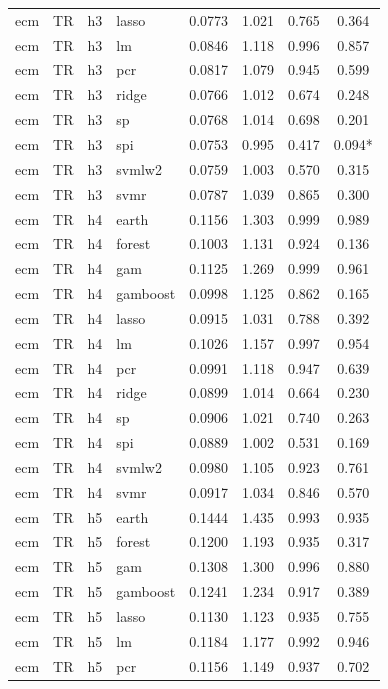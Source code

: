 \begin{ThreePartTable}
\begin{longtable}[t]{llclcccc}
ecm & TR & h3 & lasso & 0.0773 & 1.021 & 0.765 & 0.364\\
ecm & TR & h3 & lm & 0.0846 & 1.118 & 0.996 & 0.857\\
ecm & TR & h3 & pcr & 0.0817 & 1.079 & 0.945 & 0.599\\
ecm & TR & h3 & ridge & 0.0766 & 1.012 & 0.674 & 0.248\\
ecm & TR & h3 & sp & 0.0768 & 1.014 & 0.698 & 0.201\\
ecm & TR & h3 & spi & 0.0753 & 0.995 & 0.417 & 0.094*\\
ecm & TR & h3 & svmlw2 & 0.0759 & 1.003 & 0.570 & 0.315\\
ecm & TR & h3 & svmr & 0.0787 & 1.039 & 0.865 & 0.300\\
\addlinespace
ecm & TR & h4 & earth & 0.1156 & 1.303 & 0.999 & 0.989\\
ecm & TR & h4 & forest & 0.1003 & 1.131 & 0.924 & 0.136\\
ecm & TR & h4 & gam & 0.1125 & 1.269 & 0.999 & 0.961\\
ecm & TR & h4 & gamboost & 0.0998 & 1.125 & 0.862 & 0.165\\
ecm & TR & h4 & lasso & 0.0915 & 1.031 & 0.788 & 0.392\\
ecm & TR & h4 & lm & 0.1026 & 1.157 & 0.997 & 0.954\\
ecm & TR & h4 & pcr & 0.0991 & 1.118 & 0.947 & 0.639\\
ecm & TR & h4 & ridge & 0.0899 & 1.014 & 0.664 & 0.230\\
ecm & TR & h4 & sp & 0.0906 & 1.021 & 0.740 & 0.263\\
ecm & TR & h4 & spi & 0.0889 & 1.002 & 0.531 & 0.169\\
ecm & TR & h4 & svmlw2 & 0.0980 & 1.105 & 0.923 & 0.761\\
ecm & TR & h4 & svmr & 0.0917 & 1.034 & 0.846 & 0.570\\
\addlinespace
ecm & TR & h5 & earth & 0.1444 & 1.435 & 0.993 & 0.935\\
ecm & TR & h5 & forest & 0.1200 & 1.193 & 0.935 & 0.317\\
ecm & TR & h5 & gam & 0.1308 & 1.300 & 0.996 & 0.880\\
ecm & TR & h5 & gamboost & 0.1241 & 1.234 & 0.917 & 0.389\\
ecm & TR & h5 & lasso & 0.1130 & 1.123 & 0.935 & 0.755\\
ecm & TR & h5 & lm & 0.1184 & 1.177 & 0.992 & 0.946\\
ecm & TR & h5 & pcr & 0.1156 & 1.149 & 0.937 & 0.702\\

\end{longtable}
\end{ThreePartTable}

